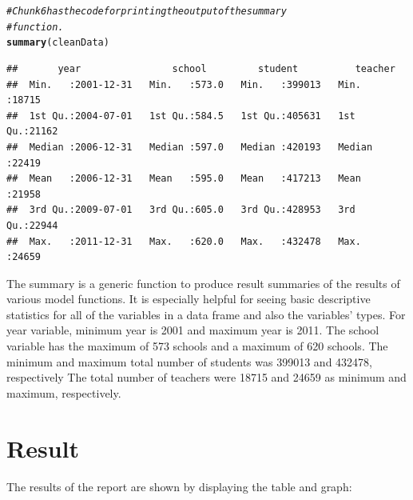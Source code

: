 \documentclass{article}\usepackage[]{graphicx}\usepackage[]{color}
\makeatletter
\newcommand{\hlcom}[1]{\textcolor[rgb]{0.678,0.584,0.686}{\textit{#1}}}%
\newcommand{\hlstd}[1]{\textcolor[rgb]{0.345,0.345,0.345}{#1}}%
\newcommand{\hlkwd}[1]{\textcolor[rgb]{0.737,0.353,0.396}{\textbf{#1}}}%
\newenvironment{kframe}{%
 \def\at@end@of@kframe{}%
 \ifinner\ifhmode%
  \def\at@end@of@kframe{\end{minipage}}%
  \begin{minipage}{\columnwidth}%
 \fi\fi%
 \def\FrameCommand##1{\hskip\@totalleftmargin \hskip-\fboxsep
 \colorbox{shadecolor}{##1}\hskip-\fboxsep
     \hskip-\linewidth \hskip-\@totalleftmargin \hskip\columnwidth}%
 \MakeFramed {\advance\hsize-\width
   \@totalleftmargin\z@ \linewidth\hsize
   \@setminipage}}%
 {\par\unskip\endMakeFramed%
 \at@end@of@kframe}
\newenvironment{knitrout}{}{} %
\makeatother
\begin{document}
\begin{enumerate}
\begin{knitrout}
\color{fgcolor}\begin{kframe}
\begin{alltt}
\hlcom{# Chunk6 has the code for printing the output of the summary}
\hlcom{# function.}
\hlkwd{summary}\hlstd{(cleanData)}
\end{alltt}
\begin{verbatim}
##       year                school         student          teacher     
##  Min.   :2001-12-31   Min.   :573.0   Min.   :399013   Min.   :18715  
##  1st Qu.:2004-07-01   1st Qu.:584.5   1st Qu.:405631   1st Qu.:21162  
##  Median :2006-12-31   Median :597.0   Median :420193   Median :22419  
##  Mean   :2006-12-31   Mean   :595.0   Mean   :417213   Mean   :21958  
##  3rd Qu.:2009-07-01   3rd Qu.:605.0   3rd Qu.:428953   3rd Qu.:22944  
##  Max.   :2011-12-31   Max.   :620.0   Max.   :432478   Max.   :24659
\end{verbatim}
\end{kframe}
\end{knitrout}

The summary is a generic function to produce result summaries of the results of various model functions. It is especially helpful for seeing basic descriptive statistics for all of the variables in a data frame and also the variables’ types. For year variable, minimum year is 2001 and maximum year is 2011. The school variable has the maximum of 573 schools  and a maximum of 620 schools. The minimum and maximum total number of students was 399013 and 432478, respectively The total number of teachers were 18715 and 24659 as minimum and maximum, respectively.

\end {enumerate}

\section {Result}

The results of the report are shown by displaying the table and graph:
\end{document}
